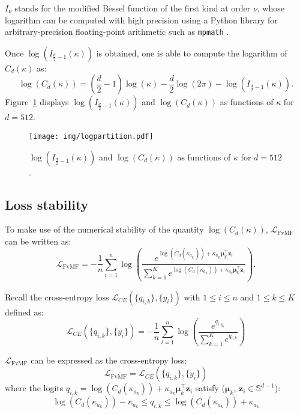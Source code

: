 \documentclass[nohyperref]{article}
\theoremstyle{plain}
\theoremstyle{definition}
\theoremstyle{remark}
\newcommand{\vect}[1]{{\bm{#1}}}
\begin{document}
$I_\nu$ stands for the modified Bessel function of the first kind at order $\nu$, whose logarithm can be computed with high precision using a Python library for arbitrary-precision floating-point arithmetic such as \texttt{mpmath}
\cite{mpmath,vmf_pytorch_implementation}.

Once $\log(I_{\frac{d}{2} - 1}(\kappa))$ is obtained, one is able to compute the logarithm of $C_d(\kappa)$ as:
\begin{equation*}
    \log(C_d(\kappa)) = (\frac{d}{2}-1) \log(\kappa) - \frac{d}{2} \log(2\pi) - \log(I_{\frac{d}{2} - 1}(\kappa)).
\end{equation*}
Figure~\ref{fig:vMF_logpartition} displays $\log(I_{\frac{d}{2} - 1}(\kappa))$ and $\log(C_d(\kappa))$ as functions of $\kappa$ for $d = 512$.

\begin{figure}[ht!]
    \centering
    \texttt{[image: img/logpartition.pdf]}
    \caption{$\log(I_{\frac{d}{2} - 1}(\kappa))$ and $\log(C_d(\kappa))$ as functions of $\kappa$ for $d = 512$.}
    \label{fig:vMF_logpartition}
\end{figure}

\subsection{Loss stability}

To make use of the numerical stability of the quantity $\log(C_d(\kappa))$, $\mathcal{L}_{\text{FvMF}}$ can be written as:
\begin{equation*} 
\mathcal{L}_{\text{FvMF}} = -\frac{1}{n} \sum\limits_{i=1}^n \log \left( \frac{ e^{\log(C_d(\kappa_{a_{y_i}})) + \kappa_{a_{y_i}}  \vect{\mu}_{y_i}^\intercal \vect{z}_i}}{ \sum_{k=1}^K e^{ \log(C_d(\kappa_{a_k})) + \kappa_{a_k} \vect{\mu}_k^\intercal \vect{z}_i} } \right).
\end{equation*}

Recall the cross-entropy loss $\mathcal{L}_{CE}(\{q_{i,k}\}, \{y_i\})$ with $1\leq i \leq n$ and $1 \leq k \leq K$ defined as:
\begin{equation*}
    \mathcal{L}_{CE}(\{q_{i,k}\}, \{y_i\}) = -\frac{1}{n} \sum\limits_{i=1}^n \log \left( \frac{ e^{q_{i, y_i}} }{ \sum_{k=1}^K e^{q_{i,k}}} \right) 
\end{equation*}

$\mathcal{L}_\text{FvMF}$ can be expressed as the cross-entropy loss:
\begin{equation*}
 \mathcal{L}_\text{FvMF} = \mathcal{L}_{CE} (\{q_{i,k}\}, \{y_i\}) 
\end{equation*}
where the logits $q_{i,k} = \log(C_d(\kappa_{a_k})) + \kappa_{a_k} \vect{\mu}_k^\intercal \vect{z}_i$ satisfy ($\vect{\mu}_k$, $\vect{z}_i \in \mathbb{S}^{d-1}$):
\begin{equation*}
\log(C_d(\kappa_{a_k})) - \kappa_{a_k} \leq q_{i,k} \leq \log(C_d(\kappa_{a_k})) + \kappa_{a_k}
\end{equation*}
\end{document}
